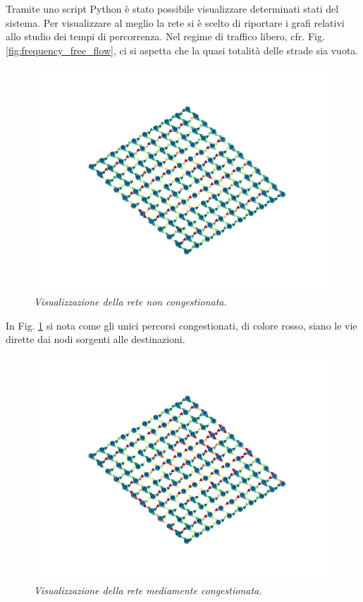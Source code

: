 Tramite uno script Python \`e stato possibile visualizzare determinati stati del sistema.
Per visualizzare al meglio la rete si \`e scelto di riportare i grafi relativi allo studio dei tempi di percorrenza.
Nel regime di traffico libero, cfr. Fig. \ref{fig:frequency_free_flow}, ci si aspetta che la quasi totalit\`a delle strade sia vuota.
\begin{figure}
    \includegraphics[scale=0.25, trim={2cm 5cm 10cm 5cm},clip]{./data/img/free_flow.png}
    \caption[Visualizzazione della rete non congestionata.]{\emph{Visualizzazione della rete non congestionata.}}
    \label{fig:visual_free}
\end{figure}
In Fig. \ref{fig:visual_free} si nota come gli unici percorsi congestionati, di colore rosso, siano le vie dirette dai nodi sorgenti alle destinazioni.
\begin{figure}
    \includegraphics[scale=0.25, trim={2cm 5cm 10cm 5cm},clip]{./data/img/flow.png}
    \caption[Visualizzazione della rete mediamente congestionata.]{\emph{Visualizzazione della rete mediamente congestionata.}}
    \label{fig:visual_medium}
\end{figure}
